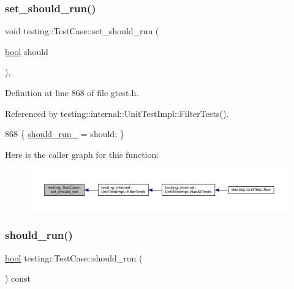 \subsubsection{\texorpdfstring{set\+\_\+should\+\_\+run()}{set\_should\_run()}}
{\footnotesize\ttfamily void testing\+::\+Test\+Case\+::set\+\_\+should\+\_\+run (\begin{DoxyParamCaption}\item[{\hyperlink{classbool}{bool}}]{should }\end{DoxyParamCaption})\hspace{0.3cm}{\ttfamily [inline]}, {\ttfamily [private]}}



Definition at line 868 of file gtest.\+h.



Referenced by testing\+::internal\+::\+Unit\+Test\+Impl\+::\+Filter\+Tests().


\begin{DoxyCode}
868 \{ \hyperlink{classtesting_1_1TestCase_a2f98fefe1f624c879e0320882c561d85}{should\_run\_} = should; \}
\end{DoxyCode}
Here is the caller graph for this function\+:
\nopagebreak
\begin{figure}[H]
\begin{center}
\leavevmode
\includegraphics[width=350pt]{classtesting_1_1TestCase_a58ecf00d6682b83caef887682b6012f0_icgraph}
\end{center}
\end{figure}
\mbox{\label{classtesting_1_1TestCase_a843d6cd43f3e587bfa8681990b9d59df}} 
\subsubsection{\texorpdfstring{should\+\_\+run()}{should\_run()}}
{\footnotesize\ttfamily \hyperlink{classbool}{bool} testing\+::\+Test\+Case\+::should\+\_\+run (\begin{DoxyParamCaption}{ }\end{DoxyParamCaption}) const\hspace{0.3cm}{\ttfamily [inline]}}



